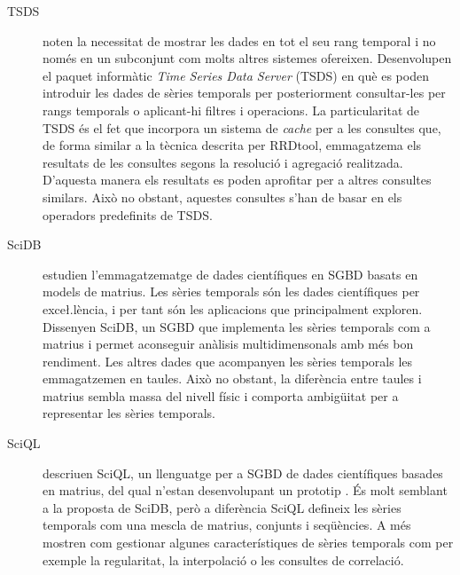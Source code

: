 \begin{description}



\item[TSDS] \textcite{weigel10} noten la necessitat de mostrar les
  dades en tot el seu rang temporal i no només en un subconjunt com
  molts altres sistemes ofereixen. Desenvolupen el paquet informàtic
  \emph{Time Series Data Server} (TSDS) \parencite{tsds} en què es
  poden introduir les dades de sèries temporals per posteriorment
  consultar-les per rangs temporals o aplicant-hi filtres i
  operacions. La particularitat de TSDS és el fet que incorpora un
  sistema de \emph{cache} per a les consultes que, de forma similar a
  la tècnica descrita per RRDtool, emmagatzema els resultats de les
  consultes segons la resolució i agregació realitzada. D'aquesta
  manera els resultats es poden aprofitar per a altres consultes
  similars. Això no obstant, aquestes consultes s'han de basar en els
  operadors predefinits de TSDS.







\item[SciDB] \textcite{stonebraker09:scidb} estudien l'emmagatzematge
  de dades científiques en \gls{SGBD} basats en models de matrius.
  Les sèries temporals són les dades científiques per exce\l.lència, i
  per tant són les aplicacions que principalment exploren.  Dissenyen
  SciDB, un \gls{SGBD} que implementa les sèries temporals com a
  matrius i permet aconseguir anàlisis multidimensonals amb més bon
  rendiment. Les altres dades que acompanyen les sèries temporals les
  emmagatzemen en taules. Això no obstant, la diferència entre taules
  i matrius sembla massa del nivell físic i comporta ambigüitat per a
  representar les sèries temporals.





\item[SciQL] \textcite{kersten11,zhang11} descriuen SciQL, un
  llenguatge per a \gls{SGBD} de dades científiques basades en
  matrius, del qual n'estan desenvolupant un
  prototip \parencite{sciql}. És molt semblant a la proposta de SciDB,
  però a diferència SciQL defineix les sèries temporals com una mescla
  de matrius, conjunts i seqüències. A més mostren com gestionar
  algunes característiques de sèries temporals com per exemple la
  regularitat, la interpolació o les consultes de correlació.









\end{description}

